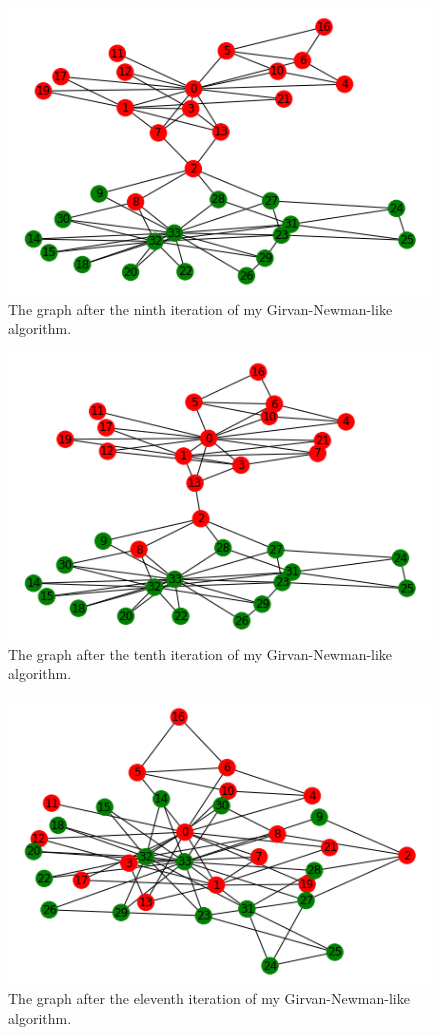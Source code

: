 \documentclass[12pt]{article}
\begin{document}
\pagebreak

\begin{figure}[h]
    \centering
    \includegraphics{iteration9.png}
    \caption{The graph after the ninth iteration of my Girvan-Newman-like algorithm.}
    \label{fig:iteration9}
\end{figure}

\pagebreak

\begin{figure}[h]
    \centering
    \includegraphics{iteration10.png}
    \caption{The graph after the tenth iteration of my Girvan-Newman-like algorithm.}
    \label{fig:iteration10}
\end{figure}

\pagebreak

\begin{figure}[h]
    \centering
    \includegraphics{iteration11.png}
    \caption{The graph after the eleventh iteration of my Girvan-Newman-like algorithm.}
    \label{fig:iteration11}
\end{figure}
\end{document}
